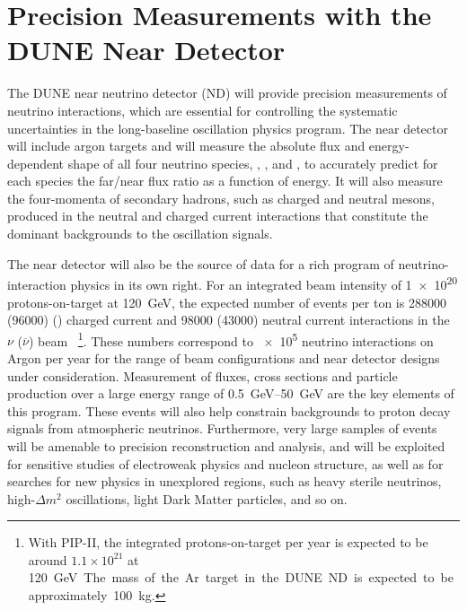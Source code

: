 %
%
\section{Precision Measurements with the DUNE Near Detector}

The DUNE near neutrino detector (ND) will provide precision measurements of
neutrino interactions, which are essential
for controlling the systematic uncertainties in the long-baseline
oscillation physics program.  The near detector %
will include argon targets and will measure the absolute flux and energy-dependent
shape of all four neutrino species, \numu, \anumu, \nue and \anue,
to accurately predict for each species the
far/near flux ratio as a function of energy.  It will also measure the
four-momenta of secondary hadrons, such as charged and neutral mesons,
produced in the neutral and charged current interactions that
constitute the dominant backgrounds to the oscillation signals.

The near detector will also be the source of data for a rich program
of neutrino-interaction physics in its own right. For an integrated
beam intensity of \num{1e20} %
protons-on-target at \SI{120}{GeV}, the expected number of events per
ton is \num{288000} (\num{96000}) %
\numu (\anumu) charged current and \num{98000} (\num{43000}) neutral
current interactions in the $\nu$ ($\overline\nu$) beam
~\footnote{With PIP-II, the integrated protons-on-target per year is
  expected to be around $1.1\times 10^{21}$ at \SI{120}\GeV. The mass
  of the Ar target in the DUNE ND is expected to be approximately
  100~kg.}. These numbers correspond to \num{e5} neutrino interactions
on Argon per year for the range of beam configurations and near detector
designs under consideration.  Measurement of fluxes, cross sections
and particle production over a large energy range of
\SIrange{0.5}{50}{\GeV} are the key elements of this program.  These
events will also help constrain backgrounds to proton decay signals
from atmospheric neutrinos.  Furthermore, very large samples of events
will be amenable to precision reconstruction and analysis, and will be
exploited for sensitive studies of electroweak physics and nucleon
structure, as well as for searches for new physics in unexplored
regions, such as heavy sterile neutrinos, high-$\Delta m^2$
oscillations, light Dark Matter particles, and so on.

